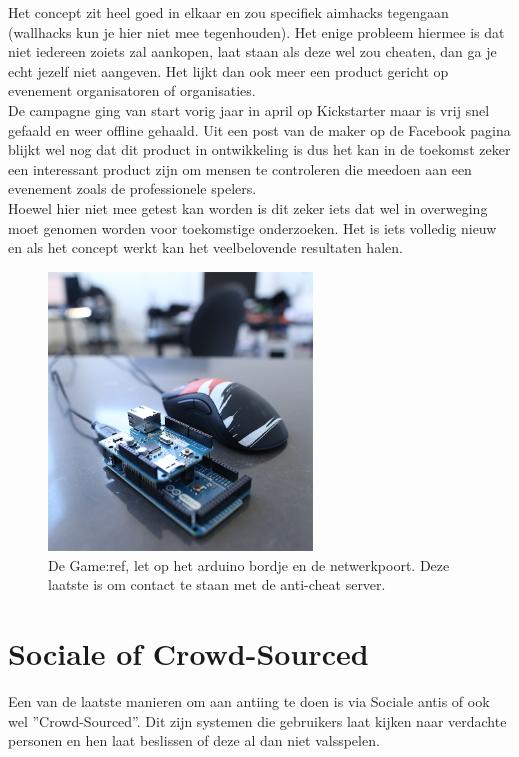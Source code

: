 \documentclass[pdftex,a4paper,12pt,twoside]{report}
\begin{document}
Het concept zit heel goed in elkaar en zou specifiek \gls{aim}hacks tegengaan (wallhacks kun je hier niet mee tegenhouden). Het enige probleem hiermee is dat niet iedereen zoiets zal aankopen, laat staan als deze wel zou \gls{cheat}en, dan ga je echt jezelf niet aangeven. Het lijkt dan ook meer een product gericht op evenement organisatoren of organisaties. 
\\

De campagne ging van start vorig jaar in april op Kickstarter maar is vrij snel gefaald en weer offline gehaald. Uit een post van de maker op de Facebook pagina blijkt wel nog dat dit product in ontwikkeling is dus het kan in de toekomst zeker een interessant product zijn om mensen te controleren die meedoen aan een evenement zoals de professionele spelers.
\citep{gameref} 
\\

Hoewel hier niet mee getest kan worden is dit zeker iets dat wel in overweging moet genomen worden voor toekomstige onderzoeken. Het is iets volledig nieuw en als het concept werkt kan het veelbelovende resultaten halen.

\begin{figure}
\centering
\includegraphics[width=7cm]{img/game-ref1}
\caption{De Game:ref, let op het arduino bordje en de netwerkpoort. Deze laatste is om contact te staan met de anti-cheat server.}
\end{figure}



\section{Sociale of Crowd-Sourced}
\label{sec:sociale}
Een van de laatste manieren om aan \gls{anti}ing te doen is via Sociale \gls{anti}s of ook wel ''Crowd-Sourced''. Dit zijn systemen die gebruikers laat kijken naar verdachte personen en hen laat beslissen of deze al dan niet valsspelen. 
\\
\end{document}
